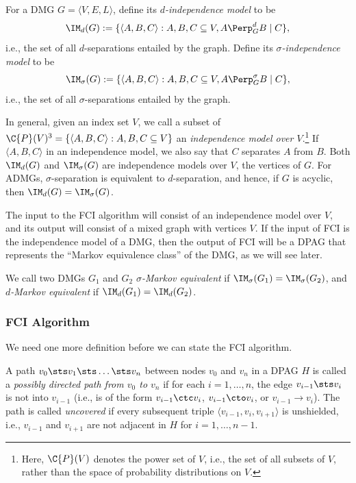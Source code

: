 \begin{Def}
For a DMG $G = \langle V, E, L \rangle$, define its \emph{$d$-independence model} to be
$$\IM_d(G) := \{ \langle A, B, C \rangle : A, B, C \subseteq V, A \Perp_G^d B \mid C \},$$
i.e., the set of all $d$-separations entailed by the graph. Define its
\emph{$\sigma$-independence model} to be
$$\IM_\sigma(G) := \{ \langle A, B, C \rangle : A, B, C \subseteq V, A \Perp_G^\sigma B \mid C \},$$
i.e., the set of all $\sigma$-separations entailed by the graph. 
\end{Def}
In general, given an index set $V$, we call a subset of 
$\C{P}(V)^3 = \{ \langle A, B, C \rangle : A, B, C \subseteq V \}$
an \emph{independence model over $V$}.\footnote{Here, $\C{P}(V)$ denotes the power set of $V$, i.e., the set of all subsets of $V$, rather than the space of probability distributions on $V$.}
If $\langle A, B, C \rangle$ in an independence model, we also say that $C$ separates $A$ from $B$.
Both $\IM_d(G)$ and $\IM_\sigma(G)$ are independence models over $V$, the vertices of $G$.
For ADMGs, $\sigma$-separation is equivalent to $d$-separation, and hence, if $G$ is acyclic, then
$\IM_d(G) = \IM_\sigma(G)$.

The input to the FCI algorithm will consist of an independence model over $V$,
and its output will consist of a mixed graph with vertices $V$.
If the input of FCI is the independence model of a DMG, then the output of FCI
will be a DPAG that represents the ``Markov equivalence class'' of the DMG, as
we will see later.
\begin{Def}
We call two DMGs $G_1$ and $G_2$ \emph{$\sigma$-Markov equivalent} if $\IM_\sigma(G_1) = \IM_\sigma(G_2)$,
and \emph{$d$-Markov equivalent} if $\IM_d(G_1) = \IM_d(G_2)$.
\end{Def}

\subsubsection{FCI Algorithm}

We need one more definition before we can state the FCI algorithm.
\begin{Def}\label{def:pdpath}
  A path $v_0 \sts v_1 \sts \dots \sts v_n$ between nodes $v_0$ and $v_n$ in a DPAG $H$ is called a \emph{possibly directed path from $v_0$ to $v_n$} if for each $i=1,\dots,n$, the edge $v_{i-1} \sts v_i$ is not into $v_{i-1}$ (i.e., is of the form $v_{i-1} \ctc v_i$, $v_{i-1} \cto v_i$, or $v_{i-1} \to v_i$). 
  The path is called \emph{uncovered} if every subsequent triple $\langle v_{i-1}, v_i, v_{i+1} \rangle$ is unshielded, i.e., $v_{i-1}$ and $v_{i+1}$ are not adjacent in $H$ for $i=1,\dots,n-1$.
\end{Def}


